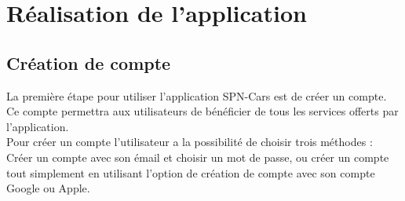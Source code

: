 \thispagestyle{plain}
\section{Réalisation de l'application}
\justifying
\subsection{Création de compte}
La première étape pour utiliser l'application SPN-Cars est de créer un compte. Ce compte permettra aux utilisateurs de bénéficier de tous les services offerts par l'application.\\
\noindent Pour créer un compte l'utilisateur a la possibilité de choisir trois méthodes : Créer un compte avec son émail et choisir un mot de passe, ou créer un compte tout simplement en utilisant l'option de création de compte avec son compte Google ou Apple.
